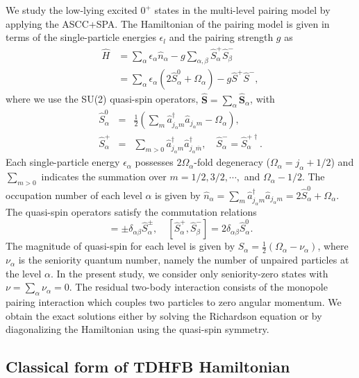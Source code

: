 \documentclass[%
superscriptaddress,
showpacs,
nofootinbib,
amsmath,amssymb,
aps,
prc,
twocolumn,
floatfix ]%
{revtex4-1}
\begin{document}
We study the low-lying excited $0^+$ states
in the multi-level pairing model by applying the ASCC+SPA.
The Hamiltonian of the pairing model is given in terms of
the single-particle energies $\epsilon_l$ and the pairing strength $g$ as
\begin{align}
	\hat{H} &= \sum_\alpha \epsilon_\alpha \hat{n}_\alpha - g \sum_{\alpha,\beta} \hat{S}_\alpha^+ \hat{S}_{\beta}^- \nonumber \\
    &= \sum_\alpha\epsilon_\alpha(2\hat{S}_\alpha^0+\Omega_\alpha) - g \hat{S}^+ \hat{S}^{-} ,
\end{align}
where we use the SU(2) quasi-spin operators,
$\boldsymbol{\hat{S}}=\sum_\alpha \boldsymbol{\hat{S}}_\alpha$, with
\begin{eqnarray}
        \hat{S}_\alpha^0 &=& \frac{1}{2}\left(\sum_m\hat{a}_{j_\alpha m}^{\dag}\hat{a}_{j_\alpha m}-\Omega_\alpha\right) ,\\
        \hat{S}_\alpha^{+} &=& \sum_{m>0}\hat{a}_{j_\alpha m}^{\dag}\hat{a}_{j_\alpha\overline{m}}^{\dag} ,
\quad   \hat{S}_\alpha^{-} = \hat{S}_\alpha^{+\dag} .
\end{eqnarray}
Each single-particle energy $\epsilon_\alpha$ possesses $2\Omega_\alpha$-fold
degeneracy ($\Omega_\alpha=j_\alpha+1/2$)
and $\sum_{m>0}$ indicates the summation over $m=1/2,3/2,\cdots,$
and $\Omega_\alpha-1/2$.
The occupation number of each level $\alpha$ is given by
$\hat{n}_\alpha = \sum_m \hat{a}^{\dag}_{j_\alpha m}\hat{a}_{j_\alpha m}
=2\hat{S}_\alpha^0+\Omega_\alpha
$.
The quasi-spin operators satisfy the commutation relations
\begin{equation}
  [\hat{S}_\alpha^0,\hat{S}_\beta^{\pm}] = \pm\delta_{\alpha\beta}\hat{S}_{\alpha}^{\pm},
\quad [\hat{S}_{\alpha}^{+},\hat{S}_{\beta}^{-}] = 2\delta_{\alpha\beta}\hat{S}_{\alpha}^{0} .
\end{equation}
The magnitude of quasi-spin for each level is given by
$S_\alpha=\frac{1}{2}(\Omega_\alpha-\nu_\alpha)$, where $\nu_\alpha$
is the seniority
quantum number, namely the number of unpaired particles at the level $\alpha$.
In the present study, we consider only seniority-zero states with
$\nu=\sum_\alpha \nu_\alpha=0$.
The residual two-body interaction consists of the monopole pairing
interaction which couples two particles to zero angular momentum.
We obtain the exact solutions either by solving the Richardson equation
\cite{Richardson,Richardson2,Richardson3} or
by diagonalizing the Hamiltonian using the quasi-spin symmetry.


\subsection{Classical form of TDHFB Hamiltonian}
\end{document}
